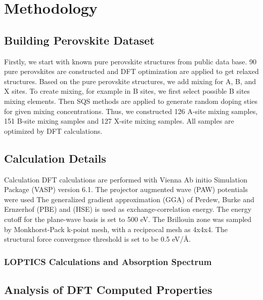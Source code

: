 \documentclass[twoside,twocolumn,9pt]{article}
\begin{document}
\section*{Methodology}
\subsection*{Building Perovskite Dataset}
Firstly, we start with known pure perovskite structures from public
data base. 90 pure perovskites are constructed and DFT optimization
are applied to get relaxed structures. Based on the pure perovskite
structures, we add mixing for A, B, and X sites. To create mixing, for
example in B sites, we first select possible B sites mixing
elements. Then SQS methods are applied to generate random doping sties
for given mixing concentrations. Thus, we constructed 126 A-site
mixing samples, 151 B-site mixing samples and 127 X-site mixing
samples. All samples are optimized by DFT calculations.

\subsection*{Calculation Details}
Calculation DFT calculations are performed with Vienna Ab initio Simulation
Package (VASP) version 6.1. The projector augmented wave (PAW)
potentials were used The generalized gradient approximation (GGA) of
Perdew, Burke and Ernzerhof (PBE) and (HSE) is used as exchange-correlation
energy. The energy cutoff for the plane-wave basis is set to 500
eV. The Brillouin zone was sampled by Monkhorst-Pack k-point mesh,
with a reciprocal mesh as 4x4x4. The structural force convergence
threshold is set to be 0.5 eV/Å.

\subsubsection*{LOPTICS Calculations and Absorption Spectrum}

\subsection*{Analysis of DFT Computed Properties} %
\end{document}
